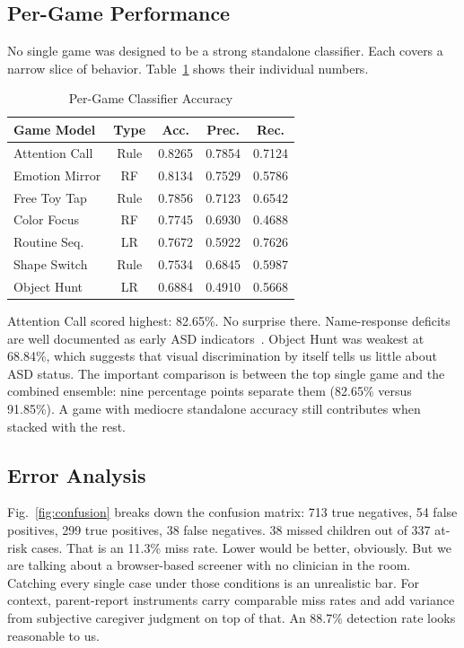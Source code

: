 \documentclass[conference]{IEEEtran}
\begin{document}
\subsection{Per-Game Performance}
No single game was designed to be a strong standalone classifier. Each covers a narrow slice of behavior. Table~\ref{tab:l1_results} shows their individual numbers.

\begin{table}[htbp]
\caption{Per-Game Classifier Accuracy}
\label{tab:l1_results}
\centering
\renewcommand{\arraystretch}{1.2}
\begin{tabular}{@{}lcccc@{}}
\toprule
\textbf{Game Model} & \textbf{Type} & \textbf{Acc.} & \textbf{Prec.} & \textbf{Rec.} \\
\midrule
Attention Call   & Rule  & 0.8265 & 0.7854 & 0.7124 \\
Emotion Mirror   & RF    & 0.8134 & 0.7529 & 0.5786 \\
Free Toy Tap     & Rule  & 0.7856 & 0.7123 & 0.6542 \\
Color Focus      & RF    & 0.7745 & 0.6930 & 0.4688 \\
Routine Seq.     & LR    & 0.7672 & 0.5922 & 0.7626 \\
Shape Switch     & Rule  & 0.7534 & 0.6845 & 0.5987 \\
Object Hunt      & LR    & 0.6884 & 0.4910 & 0.5668 \\
\bottomrule
\end{tabular}
\end{table}

Attention Call scored highest: 82.65\%. No surprise there. Name-response deficits are well documented as early ASD indicators~\cite{jones2013attention}. Object Hunt was weakest at 68.84\%, which suggests that visual discrimination by itself tells us little about ASD status. The important comparison is between the top single game and the combined ensemble: nine percentage points separate them (82.65\% versus 91.85\%). A game with mediocre standalone accuracy still contributes when stacked with the rest.

\subsection{Error Analysis}
Fig.~\ref{fig:confusion} breaks down the confusion matrix: 713 true negatives, 54 false positives, 299 true positives, 38 false negatives. 38 missed children out of 337 at-risk cases. That is an 11.3\% miss rate. Lower would be better, obviously. But we are talking about a browser-based screener with no clinician in the room. Catching every single case under those conditions is an unrealistic bar. For context, parent-report instruments carry comparable miss rates and add variance from subjective caregiver judgment on top of that. An 88.7\% detection rate looks reasonable to us.
\end{document}
